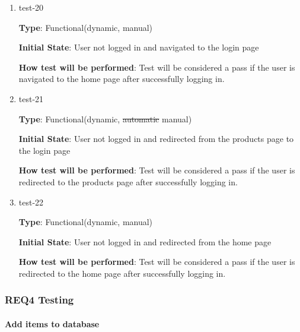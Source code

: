 \documentclass[12pt, titlepage]{article}
\begin{document}
\begin{enumerate}
\item{test-20\\}

\textbf{Type}: Functional(dynamic, manual)
					
\textbf{Initial State}: User not logged in and navigated to the login page

\textbf{How test will be performed}: Test will be considered a pass if the user is navigated to the home page after successfully logging in.
					
\item{test-21\\}

\textbf{Type}: Functional(dynamic, \sout{automatic} manual)
					
\textbf{Initial State}: User not logged in and redirected from the products page to the login page
					
\textbf{How test will be performed}: Test will be considered a pass if the user is redirected to the products page after successfully logging in.

\item{test-22\\}

\textbf{Type}: Functional(dynamic, manual)
					
\textbf{Initial State}: User not logged in and redirected from the home page
					
\textbf{How test will be performed}: Test will be considered a pass if the user is redirected to the home page after successfully logging in.

\end{enumerate}

\subsubsection{REQ4 Testing}
		
\paragraph{Add items to database}
\end{document}
